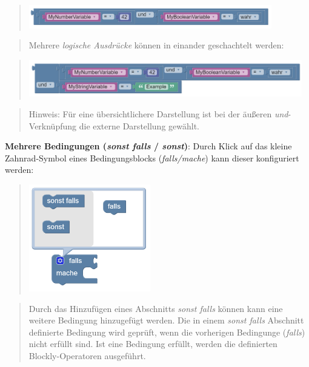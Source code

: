 \documentclass[
  letterpaper,
  DIV=11]{scrreprt}
\begin{document}
\begin{tcolorbox}
\begin{quote}
\includegraphics[width=4.16667in,height=\textheight]{img/screenshot-blockly-element-logic-combine-02-DEU.png}
\end{quote}

\begin{quote}
Mehrere \emph{logische Ausdrücke} können in einander geschachtelt
werden:
\end{quote}

\begin{quote}
\includegraphics[width=4.6875in,height=\textheight]{img/screenshot-blockly-element-logic-combine-03-DEU.png}
\end{quote}

\begin{quote}
Hinweis: Für eine übersichtlichere Darstellung ist bei der äußeren
\emph{und}-Verknüpfung die externe Darstellung gewählt.
\end{quote}

\textbf{Mehrere Bedingungen (\emph{sonst falls} / \emph{sonst})}: Durch
Klick auf das kleine Zahnrad-Symbol eines Bedingungsblocks
(\emph{falls/mache}) kann dieser konfiguriert werden:

\begin{quote}
\includegraphics[width=2.08333in,height=\textheight]{img/screenshot-routing-block-if-then-configuration-01-DEU.png}
\end{quote}

\begin{quote}
Durch das Hinzufügen eines Abschnitts \emph{sonst falls} können kann
eine weitere Bedingung hinzugefügt werden. Die in einem \emph{sonst
falls} Abschnitt definierte Bedingung wird geprüft, wenn die vorherigen
Bedingunge (\emph{falls}) nicht erfüllt sind. Ist eine Bedingung
erfüllt, werden die definierten Blockly-Operatoren ausgeführt.
\end{quote}


\end{tcolorbox}
\end{document}
